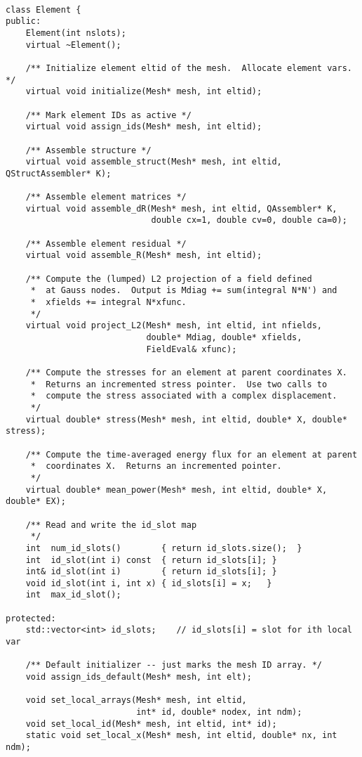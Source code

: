 \begin{verbatim}

class Element {
public:
    Element(int nslots);
    virtual ~Element();

    /** Initialize element eltid of the mesh.  Allocate element vars. */
    virtual void initialize(Mesh* mesh, int eltid);

    /** Mark element IDs as active */
    virtual void assign_ids(Mesh* mesh, int eltid);

    /** Assemble structure */
    virtual void assemble_struct(Mesh* mesh, int eltid, QStructAssembler* K);

    /** Assemble element matrices */
    virtual void assemble_dR(Mesh* mesh, int eltid, QAssembler* K,
                             double cx=1, double cv=0, double ca=0);

    /** Assemble element residual */
    virtual void assemble_R(Mesh* mesh, int eltid);

    /** Compute the (lumped) L2 projection of a field defined
     *  at Gauss nodes.  Output is Mdiag += sum(integral N*N') and
     *  xfields += integral N*xfunc.
     */
    virtual void project_L2(Mesh* mesh, int eltid, int nfields,
                            double* Mdiag, double* xfields,
                            FieldEval& xfunc);

    /** Compute the stresses for an element at parent coordinates X.
     *  Returns an incremented stress pointer.  Use two calls to
     *  compute the stress associated with a complex displacement.
     */
    virtual double* stress(Mesh* mesh, int eltid, double* X, double* stress);

    /** Compute the time-averaged energy flux for an element at parent
     *  coordinates X.  Returns an incremented pointer.
     */
    virtual double* mean_power(Mesh* mesh, int eltid, double* X, double* EX);

    /** Read and write the id_slot map
     */
    int  num_id_slots()        { return id_slots.size();  }
    int  id_slot(int i) const  { return id_slots[i]; }
    int& id_slot(int i)        { return id_slots[i]; }
    void id_slot(int i, int x) { id_slots[i] = x;   }
    int  max_id_slot();

protected:
    std::vector<int> id_slots;    // id_slots[i] = slot for ith local var

    /** Default initializer -- just marks the mesh ID array. */
    void assign_ids_default(Mesh* mesh, int elt);

    void set_local_arrays(Mesh* mesh, int eltid,
                          int* id, double* nodex, int ndm);
    void set_local_id(Mesh* mesh, int eltid, int* id);
    static void set_local_x(Mesh* mesh, int eltid, double* nx, int ndm);


\end{verbatim}
